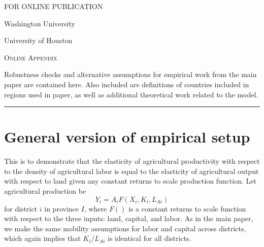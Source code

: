 \documentclass[11pt]{article}
\begin{document}
\begin{titlepage}
\hfill \textsc{FOR ONLINE PUBLICATION}

\vspace{1in} \noindent {\large \today}

\vspace{.5in} 

\vspace{.25in} 

\vspace{.05in} \noindent Washington University

\vspace{.25in} 

\vspace{.05in} \noindent University of Houston

\vspace{2in} \noindent \textsc{Online Appendix} \hrulefill

\vspace{.05in} \noindent Robustness checks and alternative assumptions for empirical work from the main paper are contained here. Also included are definitions of countries included in regions used in paper, as well as additional theoretical work related to the model.
\vspace{.1in} \hrule

\end{titlepage}

\pagebreak 

\tableofcontents

\section{General version of empirical setup}
This is to demonstrate that the elasticity of agricultural productivity with respect to the density of agricultural labor is equal to the elasticity of agricultural output with respect to land given any constant returns to scale production function. Let agricultural production be
\begin{equation}
    Y_i = A_i F(X_i,K_i,L_{Ai}) 
\end{equation}
for district $i$ in province $I$, where $F()$ is a constant returns to scale function with respect to the three inputs: land, capital, and labor. As in the main paper, we make the same mobility assumptions for labor and capital across districts, which again implies that $K_i/L_{Ai}$ is identical for all districts. 
\end{document}
